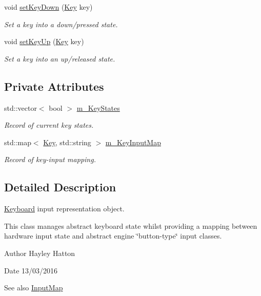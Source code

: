 \begin{DoxyCompactItemize}
void \hyperlink{class_keyboard_ab30876616db49352806d7cccd478c3cc}{set\+Key\+Down} (\hyperlink{_key_8h_ab3c7af4820830f9166ede9e5623c4e73}{Key} key)
\begin{DoxyCompactList}\small\item\em Set a key into a down/pressed state. \end{DoxyCompactList}\item 
void \hyperlink{class_keyboard_a6903d3be760e83604651e410805b6192}{set\+Key\+Up} (\hyperlink{_key_8h_ab3c7af4820830f9166ede9e5623c4e73}{Key} key)
\begin{DoxyCompactList}\small\item\em Set a key into an up/released state. \end{DoxyCompactList}\end{DoxyCompactItemize}
\subsection*{Private Attributes}
\begin{DoxyCompactItemize}
\item 
std\+::vector$<$ bool $>$ \hyperlink{class_keyboard_ae927c3cd0e8730ab94b8e9538d44c97e}{m\+\_\+\+Key\+States}
\begin{DoxyCompactList}\small\item\em Record of current key states. \end{DoxyCompactList}\item 
std\+::map$<$ \hyperlink{_key_8h_ab3c7af4820830f9166ede9e5623c4e73}{Key}, std\+::string $>$ \hyperlink{class_keyboard_a9529ce9519c46b47743e643d00ab376b}{m\+\_\+\+Key\+Input\+Map}
\begin{DoxyCompactList}\small\item\em Record of key-\/input mapping. \end{DoxyCompactList}\end{DoxyCompactItemize}


\subsection{Detailed Description}
\hyperlink{class_keyboard}{Keyboard} input representation object. 

This class manages abstract keyboard state whilst providing a mapping between hardware input state and abstract engine \char`\"{}button-\/type\char`\"{} input classes.

\begin{DoxyAuthor}{Author}
Hayley Hatton 
\end{DoxyAuthor}
\begin{DoxyDate}{Date}
13/03/2016 
\end{DoxyDate}
\begin{DoxySeeAlso}{See also}
\hyperlink{class_input_map}{Input\+Map} 
\end{DoxySeeAlso}


